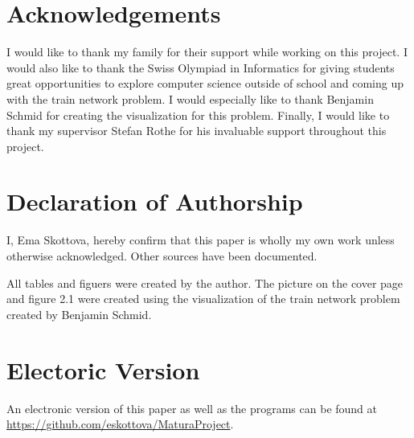 \documentclass[10pt]{scrreprt}
\begin{document}
\newpage


\chapter*{Acknowledgements}

I would like to thank my family for their support while working on this project. I would also like to thank the Swiss Olympiad in Informatics for giving students great opportunities to explore computer science outside of school and coming up with the train network problem. I would especially like to thank Benjamin Schmid for creating the visualization for this problem. Finally, I would like to thank my supervisor Stefan Rothe for his invaluable support throughout this project.

\chapter*{Declaration of Authorship}

I, Ema Skottova, hereby confirm that this paper is wholly my own work unless otherwise acknowledged. Other sources have been documented.

\listoffigures

\listoftables

All tables and figuers were created by the author. The picture on the cover page and figure 2.1 were created using the visualization of the train network problem created by Benjamin Schmid.

\printbibliography

\chapter*{Electoric Version}
An electronic version of this paper as well as the programs can be found at \url{https://github.com/eskottova/MaturaProject}.
\end{document}
